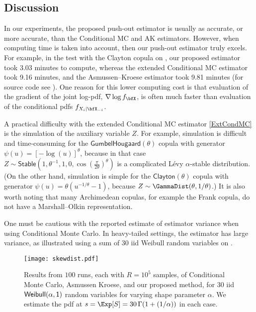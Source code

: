 \subsection{Discussion} \label{sec:Discussion}
In our experiments, the proposed push-out estimator is usually as accurate, or more accurate, than the Conditional MC and AK estimators. However, when computing time is taken into account, then our push-out estimator truly excels.  For example, in the test with the Clayton copula on , our proposed estimator took 3.03 minutes to compute, whereas the extended Conditional MC estimator took 9.16 minutes, and the Asmussen--Kroese estimator took 9.81 minutes
(for source code see \cite{PushoutCode}). One reason for this lower computing cost is that evaluation of the gradient of the joint log-pdf, $\nabla \log f_{\bfX}$, is often much faster than evaluation of the conditional pdfs $f_{X_i | \bfX_{-i}}$.

A practical difficulty with the extended Conditional MC estimator \eqref{ExtCondMC} is the simulation of the auxiliary variable $Z$.
For example, simulation is difficult and time-consuming for the $\mathsf{GumbelHougaard}(\theta)$ copula with generator $\psi(u) = [-\log( u )]^\theta$, because in that case  $Z \sim \mathsf{Stable}(1, \theta^{-1}, 1, 0, \cos(\frac{\pi}{2 \theta})^\theta)$ is a complicated L\'evy $\alpha$-stable distribution. (On the other hand, simulation is simple for the $\mathsf{Clayton}(\theta)$ copula with generator $\psi(u) = \theta (u^{-1/\theta} - 1)$, because  $Z \sim \GammaDist(\theta, 1/\theta)$.) It is also worth noting that many Archimedean copulas, for example the Frank copula, do not have a Marshall--Olkin representation.

One must be cautious with the reported estimate of estimator variance when using Conditional Monte Carlo. In heavy-tailed settings, the estimator has large variance, as illustrated using a sum of 30 iid Weibull random variables on .

 \begin{figure}[htb]
    \centering
    \texttt{[image: skewdist.pdf]}
    \caption{Results from $100$ runs, each with $R=10^5$ samples, of Conditional Monte Carlo, Asmussen Kroese, and our proposed method, for 30 iid $\sf{Weibull}(\alpha,1)$ random variables for varying shape parameter $\alpha$. We estimate the pdf at $s = \Exp[S] = 30 \,\Gamma(1+(1/\alpha))$ in each case.}

		\label{fig:weibull}
\end{figure}


